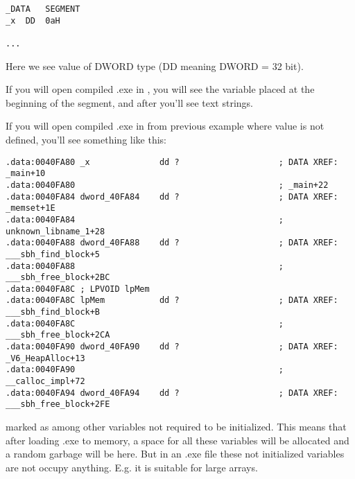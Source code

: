 \begin{lstlisting}
_DATA	SEGMENT
_x	DD	0aH

...
\end{lstlisting}

{Here we see value  of DWORD type (DD meaning DWORD = 32 bit).}

{If you will open compiled .exe in \IDA, you will see the  variable placed at the beginning of 
the  segment, and after you'll see text strings.}

{If you will open compiled .exe in \IDA from previous example where  value is not defined, 
you'll see something like this:}

\begin{lstlisting}
.data:0040FA80 _x              dd ?                    ; DATA XREF: _main+10
.data:0040FA80                                         ; _main+22
.data:0040FA84 dword_40FA84    dd ?                    ; DATA XREF: _memset+1E
.data:0040FA84                                         ; unknown_libname_1+28
.data:0040FA88 dword_40FA88    dd ?                    ; DATA XREF: ___sbh_find_block+5
.data:0040FA88                                         ; ___sbh_free_block+2BC
.data:0040FA8C ; LPVOID lpMem
.data:0040FA8C lpMem           dd ?                    ; DATA XREF: ___sbh_find_block+B
.data:0040FA8C                                         ; ___sbh_free_block+2CA
.data:0040FA90 dword_40FA90    dd ?                    ; DATA XREF: _V6_HeapAlloc+13
.data:0040FA90                                         ; __calloc_impl+72
.data:0040FA94 dword_40FA94    dd ?                    ; DATA XREF: ___sbh_free_block+2FE
\end{lstlisting}

{ marked as  among other variables not required to be initialized. 
This means that after loading .exe to memory, a space for all these variables will be 
allocated and a random garbage will be here. 
But in an .exe file these not initialized variables are not occupy anything. 
E.g. it is suitable for large arrays.}


